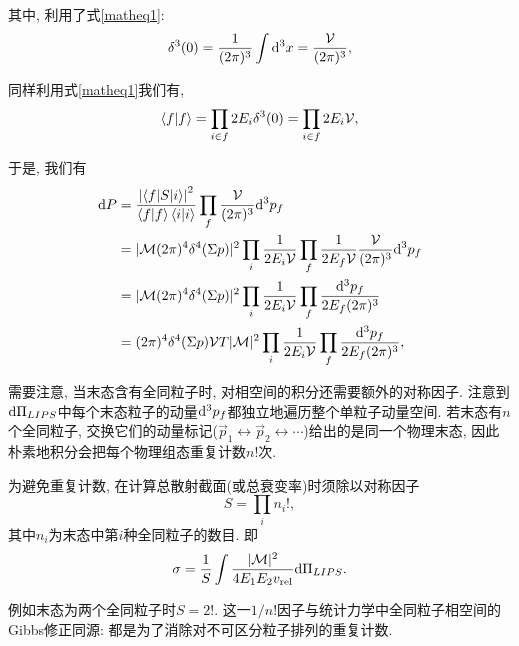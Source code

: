 其中, 利用了式\eqref{matheq1}:
\begin{equation}
    \delta^3(0)=\frac1{(2\pi)^{3}}\int \mathrm d^3x=\frac{\mathcal V}{(2\pi)^{3}},
\end{equation}

同样利用式\eqref{matheq1}我们有, 
\begin{equation}
    \braket{f|f}=\prod_{i\in f} 2E_{i}\delta^3(0)=\prod_{i\in f} 2E_{i}\mathcal V,
\end{equation}

于是, 我们有
\begin{align}
    \mathrm d P&=\frac{\left|\braket{f|S|i}\right|^2}{\braket{f|f}\braket{i|i}}\prod_{f} \frac{\mathcal V}{(2\pi)^{3}}\mathrm d^3p_f\\
    &=|\mathcal M(2\pi)^{4}\delta^4(\Sigma p)|^2\prod_{i}\frac1{2E_i\mathcal V}\prod_{f}\frac1{2E_f\mathcal V} \frac{\mathcal V}{(2\pi)^{3}}\mathrm d^3p_f\\
    &=|\mathcal M(2\pi)^{4}\delta^4(\Sigma p)|^2\prod_{i}\frac1{2E_i\mathcal V}\prod_{f}\frac{\mathrm d^3p_f}{2E_f(2\pi)^{3}}\\
    &=(2\pi)^{4}\delta^4(\Sigma p)\mathcal VT|\mathcal M|^2\prod_{i}\frac1{2E_i\mathcal V}\prod_{f}\frac{\mathrm d^3p_f}{2E_f(2\pi)^{3}},
\end{align}

需要注意, 当末态含有全同粒子时, 对相空间的积分还需要额外的对称因子. 注意到$\mathrm d\Pi_{LIPS}$中每个末态粒子的动量$\mathrm d^3p_f$都独立地遍历整个单粒子动量空间. 若末态有$n$个全同粒子, 交换它们的动量标记($\vec p_1\leftrightarrow\vec p_2\leftrightarrow\cdots$)给出的是同一个物理末态, 因此朴素地积分会把每个物理组态重复计数$n!$次.
\begin{important}
    为避免重复计数, 在计算总散射截面(或总衰变率)时须除以对称因子
    \begin{equation}\label{final-state-symmetry-factor}
        S=\prod_i n_i!,
    \end{equation}
    其中$n_i$为末态中第$i$种全同粒子的数目. 即
    \begin{equation}
        \sigma=\frac1S\int\frac{|\mathcal M|^2}{4E_1E_2v_{\mathrm{rel}}}\mathrm d\Pi_{LIPS}.
    \end{equation}
\end{important}
例如末态为两个全同粒子时$S=2!$. 这一$1/n!$因子与统计力学中全同粒子相空间的Gibbs修正同源: 都是为了消除对不可区分粒子排列的重复计数.

